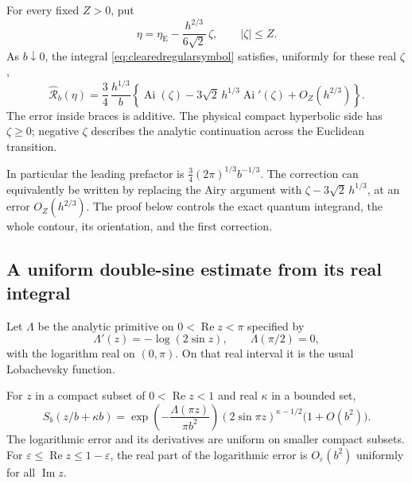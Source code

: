 \begin{proposition}
\label{prop:regularquantumAiry}
For every fixed $Z>0$, put
\[
 \eta=\eta_{\mathrm E}
       -\frac{h^{2/3}}{6\sqrt2}\,\zeta,
       \qquad |\zeta|\le Z.
\]
As $b\downarrow0$, the integral \eqref{eq:clearedregularsymbol}
satisfies, uniformly for these real $\zeta$,
\begin{equation}
 \boxed{\quad
 \widehat{\mathcal R}_b(\eta)=
 \frac34\,\frac{h^{1/3}}{b}
 \left\{
 \operatorname{Ai}(\zeta)
 -3\sqrt2\,h^{1/3}\operatorname{Ai}'(\zeta)
 +O_Z(h^{2/3})
 \right\}.
 \quad}
 \label{eq:quantumAirytheorem}
\end{equation}
The error inside braces is additive. The physical compact
hyperbolic side has $\zeta\ge0$; negative $\zeta$ describes the
analytic continuation across the Euclidean transition.
\end{proposition}

In particular the leading prefactor is
$\frac34(2\pi)^{1/3}b^{-1/3}$. The correction can equivalently
be written by replacing the Airy argument with
$\zeta-3\sqrt2\,h^{1/3}$, at an error $O_Z(h^{2/3})$.
The proof below controls the exact quantum integrand, the whole
contour, its orientation, and the first correction.

\subsection{A uniform double-sine estimate from its real integral}

Let $\Lambda$ be the analytic primitive on
$0<\operatorname{Re}z<\pi$ specified by
\[
 \Lambda'(z)=-\log(2\sin z),\qquad \Lambda(\pi/2)=0,
\]
with the logarithm real on $(0,\pi)$. On that real interval it is
the usual Lobachevsky function.

\begin{lemma}
\label{lem:stripdoubleSine}
For $z$ in a compact subset of $0<\operatorname{Re}z<1$ and
real $\kappa$ in a bounded set,
\begin{equation}
 S_b(z/b+\kappa b)
 =
 \exp\!\left(-\frac{\Lambda(\pi z)}{\pi b^2}\right)
 (2\sin\pi z)^{\kappa-1/2}
 \bigl(1+O(b^2)\bigr).
 \label{eq:uniformstripSb}
\end{equation}
The logarithmic error and its derivatives are uniform on
smaller compact subsets. For
$\varepsilon\le\operatorname{Re}z\le1-\varepsilon$,
the real part of the logarithmic error is $O_\varepsilon(b^2)$
uniformly for all $\operatorname{Im}z$.
\end{lemma}

